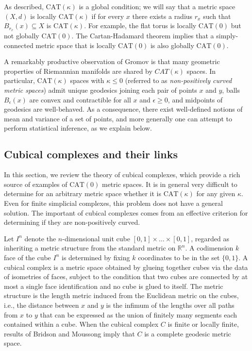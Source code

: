 \documentclass[a4paper,11pt]{article}
\newcommand{\CAT}{\textrm{CAT}}
\begin{document}
As described, $\CAT(\kappa)$ is a global condition; we will say that a metric space $(X,d)$ is locally $\CAT(\kappa)$ if for every $x$ there exists a radius $r_x$ such that $B_{r_x}(x) \subseteq X$ is $\CAT(\kappa)$.
For example, the flat torus is locally $\CAT(0)$ but not globally $\CAT(0)$.
The Cartan-Hadamard theorem implies that a simply-connected metric space that is locally $\CAT(0)$ is also globally $\CAT(0)$.

A remarkably productive observation of Gromov is that many geometric properties of Riemannian manifolds are shared by $CAT(\kappa)$ spaces.
In particular, $\CAT(\kappa)$ spaces with $\kappa \leq 0$ (referred to as {\em non-positively curved metric spaces}) admit unique geodesics joining each pair of points $x$ and $y$, balls $B_{\epsilon}(x)$ are convex and contractible for all $x$ and $\epsilon \geq 0$, and midpoints of geodesics are well-behaved.
As a consequence, there exist well-defined notions of mean and variance of a set of points, and more generally one can attempt to perform statistical inference, as we explain below.

\subsection{Cubical complexes and their links}

In this section, we review the theory of cubical complexes, which provide a rich source of examples of $\CAT(0)$ metric spaces.
It is in general very difficult to determine for an arbitrary metric space whether it is $\CAT(\kappa)$ for any given $\kappa$.
Even for finite simplicial complexes, this problem does not have a general solution.
The important of cubical complexes comes from an effective criterion for determining if they are non-positively curved.

Let $I^n$ denote the $n$-dimensional unit cube $[0,1] \times \ldots \times [0,1]$, regarded as inheriting a metric structure from the standard metric on $\mathbb{R}^n$.
A codimension $k$ face of the cube $I^n$ is determined by fixing $k$ coordinates to be in the set $\{0,1\}$.
A cubical complex is a metric space obtained by glueing together cubes via the data of isometries of faces, subject to the condition that two cubes are connected by at most a single face identification and no cube is glued to itself.
The metric structure is the length metric induced from the Euclidean metric on the cubes, i.e., the distance between $x$ and $y$ is the infimum of the lengths over all paths from $x$ to $y$ that can be expressed as the union of finitely many segments each contained within a cube.
When the cubical complex $C$ is finite or locally finite, results of Bridson and Moussong imply that $C$ is a complete geodesic metric space.
\end{document}
